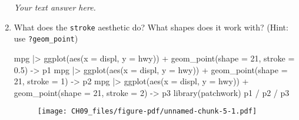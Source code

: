 \documentclass[
  letterpaper,
  DIV=11,
  numbers=noendperiod]{scrreprt}
\newenvironment{Shaded}{\begin{snugshade}}{\end{snugshade}}
\newcommand{\AttributeTok}[1]{\textcolor[rgb]{0.40,0.45,0.13}{#1}}
\newcommand{\DecValTok}[1]{\textcolor[rgb]{0.68,0.00,0.00}{#1}}
\newcommand{\FloatTok}[1]{\textcolor[rgb]{0.68,0.00,0.00}{#1}}
\newcommand{\FunctionTok}[1]{\textcolor[rgb]{0.28,0.35,0.67}{#1}}
\newcommand{\NormalTok}[1]{\textcolor[rgb]{0.00,0.23,0.31}{#1}}
\newcommand{\OtherTok}[1]{\textcolor[rgb]{0.00,0.23,0.31}{#1}}
\newcommand{\SpecialCharTok}[1]{\textcolor[rgb]{0.37,0.37,0.37}{#1}}
\begin{document}
\begin{enumerate}
\begin{tcolorbox}
  \emph{Your text answer here.}

  \end{tcolorbox}
\item
  What does the \texttt{stroke} aesthetic do? What shapes does it work
  with? (Hint: use \texttt{?geom\_point})

  \begin{tcolorbox}[enhanced jigsaw, breakable, bottomtitle=1mm, left=2mm, colback=white, toprule=.15mm, leftrule=.75mm, colframe=quarto-callout-note-color-frame, colbacktitle=quarto-callout-note-color!10!white, title={Answer}, coltitle=black, toptitle=1mm, bottomrule=.15mm, opacitybacktitle=0.6, arc=.35mm, rightrule=.15mm, titlerule=0mm, opacityback=0]

\begin{Shaded}
\begin{Highlighting}[]
\NormalTok{mpg }\SpecialCharTok{|\textgreater{}}
  \FunctionTok{ggplot}\NormalTok{(}\FunctionTok{aes}\NormalTok{(}\AttributeTok{x =}\NormalTok{ displ, }\AttributeTok{y =}\NormalTok{ hwy)) }\SpecialCharTok{+}
    \FunctionTok{geom\_point}\NormalTok{(}\AttributeTok{shape =} \DecValTok{21}\NormalTok{, }\AttributeTok{stroke =} \FloatTok{0.5}\NormalTok{) }\OtherTok{{-}\textgreater{}}\NormalTok{ p1}
\NormalTok{mpg }\SpecialCharTok{|\textgreater{}}
  \FunctionTok{ggplot}\NormalTok{(}\FunctionTok{aes}\NormalTok{(}\AttributeTok{x =}\NormalTok{ displ, }\AttributeTok{y =}\NormalTok{ hwy)) }\SpecialCharTok{+}
    \FunctionTok{geom\_point}\NormalTok{(}\AttributeTok{shape =} \DecValTok{21}\NormalTok{, }\AttributeTok{stroke =} \DecValTok{1}\NormalTok{) }\OtherTok{{-}\textgreater{}}\NormalTok{ p2}
\NormalTok{mpg }\SpecialCharTok{|\textgreater{}}
  \FunctionTok{ggplot}\NormalTok{(}\FunctionTok{aes}\NormalTok{(}\AttributeTok{x =}\NormalTok{ displ, }\AttributeTok{y =}\NormalTok{ hwy)) }\SpecialCharTok{+}
    \FunctionTok{geom\_point}\NormalTok{(}\AttributeTok{shape =} \DecValTok{21}\NormalTok{, }\AttributeTok{stroke =} \DecValTok{2}\NormalTok{) }\OtherTok{{-}\textgreater{}}\NormalTok{ p3}
\FunctionTok{library}\NormalTok{(patchwork)}
\NormalTok{p1 }\SpecialCharTok{/}\NormalTok{ p2 }\SpecialCharTok{/}\NormalTok{ p3}
\end{Highlighting}
\end{Shaded}

  \begin{figure}[H]

  {\centering \texttt{[image: CH09\_files/figure-pdf/unnamed-chunk-5-1.pdf]}

  }


\end{figure}
\end{tcolorbox}
\end{enumerate}
\end{document}

